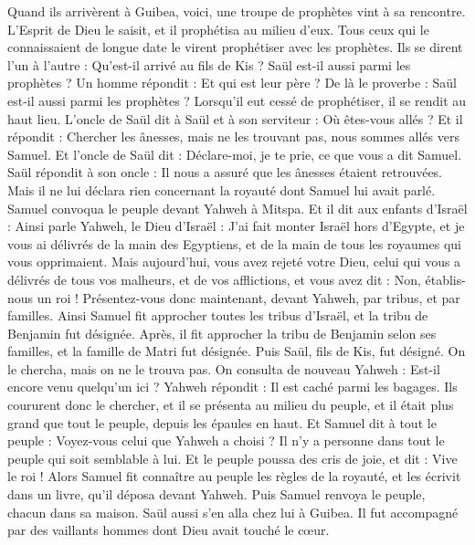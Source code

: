\begin{multicols}{2}
Quand ils arrivèrent à Guibea, voici, une troupe de prophètes vint à sa rencontre. L'Esprit de Dieu le saisit, et il prophétisa au milieu d'eux.
Tous ceux qui le connaissaient de longue date le virent prophétiser avec les prophètes. Ils se dirent l'un à l'autre : Qu'est-il arrivé au fils de Kis ? Saül est-il aussi parmi les prophètes ?
Un homme répondit : Et qui est leur père ? De là le proverbe : Saül est-il aussi parmi les prophètes ?
Lorsqu'il eut cessé de prophétiser, il se rendit au haut lieu.
L'oncle de Saül dit à Saül et à son serviteur : Où êtes-vous allés ? Et il répondit : Chercher les ânesses, mais ne les trouvant pas, nous sommes allés vers Samuel.
Et l'oncle de Saül dit : Déclare-moi, je te prie, ce que vous a dit Samuel.
Saül répondit à son oncle : Il nous a assuré que les ânesses étaient retrouvées. Mais il ne lui déclara rien concernant la royauté dont Samuel lui avait parlé.
Samuel convoqua le peuple devant Yahweh à Mitspa.
Et il dit aux enfants d'Israël : Ainsi parle Yahweh, le Dieu d'Israël : J'ai fait monter Israël hors d'Egypte, et je vous ai délivrés de la main des Egyptiens, et de la main de tous les royaumes qui vous opprimaient.
Mais aujourd'hui, vous avez rejeté votre Dieu, celui qui vous a délivrés de tous vos malheurs, et de vos afflictions, et vous avez dit : Non, établis-nous un roi ! Présentez-vous donc maintenant, devant Yahweh, par tribus, et par familles.
Ainsi Samuel fit approcher toutes les tribus d'Israël, et la tribu de Benjamin fut désignée.
Après, il fit approcher la tribu de Benjamin selon ses familles, et la famille de Matri fut désignée. Puis Saül, fils de Kis, fut désigné. On le chercha, mais on ne le trouva pas.
On consulta de nouveau Yahweh : Est-il encore venu quelqu'un ici ? Yahweh répondit : Il est caché parmi les bagages.
Ils coururent donc le chercher, et il se présenta au milieu du peuple, et il était plus grand que tout le peuple, depuis les épaules en haut.
Et Samuel dit à tout le peuple : Voyez-vous celui que Yahweh a choisi ? Il n'y a personne dans tout le peuple qui soit semblable à lui. Et le peuple poussa des cris de joie, et dit : Vive le roi !
Alors Samuel fit connaître au peuple les règles de la royauté, et les écrivit dans un livre, qu'il déposa devant Yahweh. Puis Samuel renvoya le peuple, chacun dans sa maison.
Saül aussi s'en alla chez lui à Guibea. Il fut accompagné par des vaillants hommes dont Dieu avait touché le cœur.

\end{multicols}
